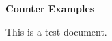 \documentclass[12pt]{article}
\begin{document}
	{\centering \huge \bf Counter Examples \par}
	\vspace{10pt}
	This is a test document.
\end{document}

